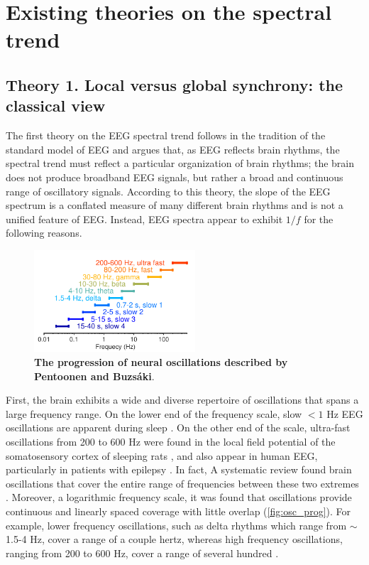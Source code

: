 \section{Existing theories on the spectral trend} \label{sec:theories}

\subsection{Theory 1. Local versus global synchrony: the classical view} \label{sec:all_oscillations}

The first theory on the EEG spectral trend follows in the tradition of the standard model of EEG and argues that, as EEG reflects brain rhythms, the spectral trend must reflect a particular organization of brain rhythms; the brain does not produce broadband EEG signals, but rather a broad and continuous range of oscillatory signals. According to this theory, the slope of the EEG spectrum is a conflated measure of many different brain rhythms and is not a unified feature of EEG. Instead, EEG spectra appear to exhibit $1/f$ for the following reasons.

\begin{figure}
\vspace{-10pt}
\centering
\includegraphics[width=60mm]{Figures/chapter1/rhythm_frequencies.pdf}
\caption{\textbf{The progression of neural oscillations described by Pentoonen and Buzsáki}\cite{Penttonen2003}.}  \label{fig:osc_prog}
\end{figure}

First, the brain exhibits a wide and diverse repertoire of oscillations that spans a large frequency range. On the lower end of the frequency scale, slow $<1$ \unit{\hertz} EEG oscillations are apparent during sleep \cite{Achermann1997}. On the other end of the scale, ultra-fast oscillations from 200 to 600 Hz were found in the local field potential of the somatosensory cortex of sleeping rats \cite{Kandel1997}, and also appear in human EEG, particularly in patients with epilepsy \cite{Frauscher2017}. In fact, A systematic review found brain oscillations that cover the entire range of frequencies between these two extremes \cite{Penttonen2003}. Moreover, a logarithmic frequency scale, it was found that oscillations provide continuous and linearly spaced coverage with little overlap (\autoref{fig:osc_prog}). For example, lower frequency oscillations, such as delta rhythms which range from $\sim$1.5-4 Hz, cover a range of a couple hertz, whereas high frequency oscillations, ranging from 200 to 600 Hz, cover a range of several hundred \cite{Penttonen2003}. 

